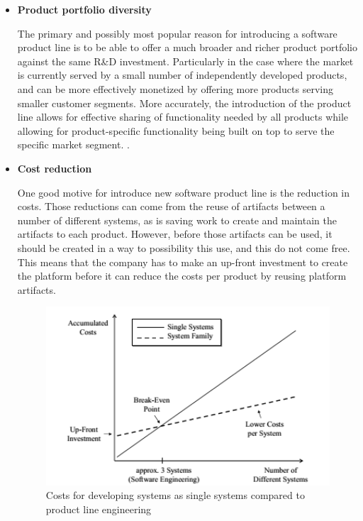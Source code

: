 \begin{itemize}

\item \textbf{Product portfolio diversity}

The primary and possibly most popular reason for introducing a software product line is to be able to offer a much broader and richer product portfolio against the same R\&D investment. Particularly in the case where the market is currently served by a small number of independently developed products, and can be more effectively monetized by offering more products serving smaller customer segments. More accurately, the introduction of the product line allows for effective sharing of functionality needed by all products while allowing for product-specific functionality being built on top to serve the specific market segment. \citep{rafael2013systems}.



\item \textbf{Cost reduction}

One good motive for introduce new software product line is the reduction in costs. Those reductions can come from the reuse of artifacts between a number of different systems, as is saving work to create and maintain the artifacts to each product. However, before those artifacts can be used, it should be created in a way to possibility this use, and this do not come free. This means that the company has to make an up-front investment to create the platform before it can reduce the costs per product by reusing platform artifacts.

\begin{figure}[htp]
\begin{center}
  \includegraphics[width=11cm]{chapters/background/img/splcosts.png}
  \caption[Costs for developing systems as single systems compared to product 
  line engineering]{Costs for developing systems as single systems compared to product line engineering \citep{Pohl2005}}
  \label{fg:spl-costs}
\end{center}
\end{figure}


\end{itemize}
